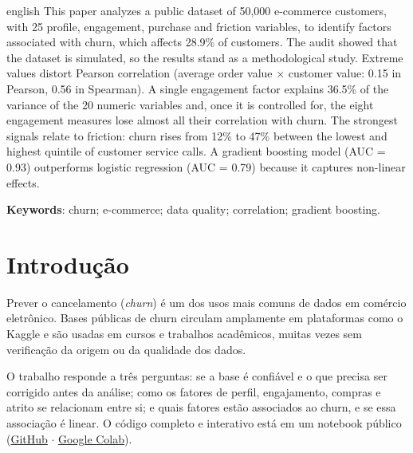 \documentclass[
  article,            %
  12pt,
  oneside,
  a4paper,
  section=TITLE,      %
  english,            %
  brazil              %
]{abntex2}
\begin{document}
\renewcommand{\resumoname}{ABSTRACT}
\begin{resumoumacoluna}
  \SingleSpacing
  \begin{otherlanguage*}{english}
    This paper analyzes a public dataset of 50,000 e-commerce customers, with 25 profile, engagement, purchase and friction variables, to identify factors associated with churn, which affects 28.9\% of customers. The audit showed that the dataset is simulated, so the results stand as a methodological study. Extreme values distort Pearson correlation (average order value $\times$ customer value: 0.15 in Pearson, 0.56 in Spearman). A single engagement factor explains 36.5\% of the variance of the 20 numeric variables and, once it is controlled for, the eight engagement measures lose almost all their correlation with churn. The strongest signals relate to friction: churn rises from 12\% to 47\% between the lowest and highest quintile of customer service calls. A gradient boosting model (AUC = 0.93) outperforms logistic regression (AUC = 0.79) because it captures non-linear effects.

    \vspace{0.5\onelineskip}
    \noindent
    \textbf{Keywords}: churn; e-commerce; data quality; correlation; gradient boosting.
  \end{otherlanguage*}
\end{resumoumacoluna}

\textual

\section{Introdução}

Prever o cancelamento (\textit{churn}) é um dos usos mais comuns de dados em comércio eletrônico. Bases públicas de churn circulam amplamente em plataformas como o Kaggle e são usadas em cursos e trabalhos acadêmicos, muitas vezes sem verificação da origem ou da qualidade dos dados.

O trabalho responde a três perguntas: se a base é confiável e o que precisa ser corrigido antes da análise; como os fatores de perfil, engajamento, compras e atrito se relacionam entre si; e quais fatores estão associados ao churn, e se essa associação é linear. O código completo e interativo está em um notebook público \cite{silva2026churn} (\href{https://github.com/joaogabrielts0611-ai/Trabalho---PSP-8}{GitHub} $\cdot$ \href{https://colab.research.google.com/github/joaogabrielts0611-ai/Trabalho---PSP-8/blob/main/analise_churn_ecommerce.ipynb}{Google Colab}).
\end{document}

